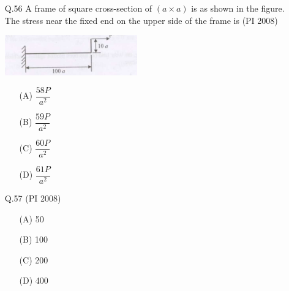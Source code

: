 \documentclass[journal,12pt,onecolumn]{IEEEtran}
\theoremstyle{remark}
\begin{document}
\begin{enumerate}
If the deflection of the free end Y is zero, then the value of P (in N) is  \hfill{(PI 2008)}
\begin{multicols}{4}
    \begin{enumerate}[label=(\Alph*)]
\item[(A)] 67
\item[(B)] 75
\item[(C)] 133
\item[(D)] 150
\end{enumerate}
\end{multicols}
\vspace{1cm}


\item[\textnormal{Q.56}] 
A frame of square cross-section of $(a \times a)$ is as shown in the figure. The stress near the fixed end on the upper side of the frame is  \hfill{(PI 2008)}

\begin{center}
\includegraphics[width=0.45\textwidth]{figures/GATE-pi-2008-56.png} %
\end{center}

\begin{multicols}{4}
    \begin{enumerate}[label=(\Alph*)]
\item[(A)] $\dfrac{58P}{a^2}$
\item[(B)] $\dfrac{59P}{a^2}$
\item[(C)] $\dfrac{60P}{a^2}$
\item[(D)] $\dfrac{61P}{a^2}$
\end{enumerate}
\end{multicols}
\vspace{1cm}
\item[\textnormal{Q.57}]
\hfill{(PI 2008)}
\begin{multicols}{4}
    \begin{enumerate}[label=(\Alph*)]
\item[(A)] 50
\item[(B)] 100
\item[(C)] 200
\item[(D)] 400
\end{enumerate}
\end{multicols}
\vspace{1cm}


\end{enumerate}
\end{document}
